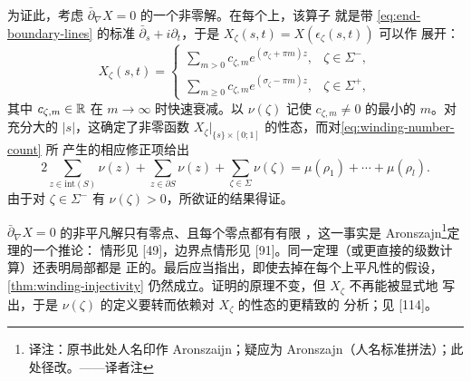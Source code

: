 为证此，考虑 $\bar\partial_\nabla X=0$ 的一个非零解。在每个\trStriplikeEnd{}上，该算子
就是带\trBoundaryCondition{} \eqref{eq:end-boundary-lines} 的标准
$\bar\partial_s+i\partial_t$，于是 $X_\zeta(s,t)=X(\epsilon_\zeta(s,t))$ 可以作%
\trFourier{}展开：
\begin{equation*}
X_\zeta(s,t)=
\begin{cases}
\sum_{m>0}c_{\zeta,m}e^{(\sigma_\zeta+\pi m)z}, & \zeta\in\Sigma^-,\\
\sum_{m\ge 0}c_{\zeta,m}e^{(\sigma_\zeta-\pi m)z}, & \zeta\in\Sigma^+,
\end{cases}
\end{equation*}
其中\trCoefficients{} $c_{\zeta,m}\in\mathbb{R}$ 在 $m\to\infty$ 时快速衰减。以 $\nu(\zeta)$ 记使
$c_{\zeta,m}\neq 0$ 的最小的 $m$。对充分大的 $|s|$，这确定了非零函数
$X_\zeta|_{\{s\}\times[0;1]}$ 的\trTopology{}性态，而对\eqref{eq:winding-number-count} 所
产生的相应修正项给出
\begin{equation*}
2\sum_{z\in\mathrm{int}(S)}\nu(z)+\sum_{z\in\partial S}\nu(z)+\sum_{\zeta\in\Sigma}\nu(\zeta)
=\mu(\rho_1)+\cdots+\mu(\rho_l).
\end{equation*}
由于对 $\zeta\in\Sigma^-$ 有 $\nu(\zeta)>0$，所欲证的结果得证。
\begin{remark}\label{thm:zeros-finite-multiplicity}
$\bar\partial_\nabla X=0$ 的非平凡解只有\trIsolated{}零点、且每个零点都有有限%
\trMultiplicity，这一事实是 Aronszajn\footnote{译注：原书此处人名印作 Aronszaijn；疑应为 Aronszajn（人名标准拼法）；此处径改。——译者注}\trUniqueContinuation{}定理的一个推论：%
\trInteriorPoint{}情形见 [49]，边界点情形见 [91]。同一定理（或更直接的\trTaylor{}级数计算）还表明局部\trMultiplicity{}都是
正的。最后应当指出，即使去掉在每个\trStriplikeEnd{}上平凡性的假设，
\cref{thm:winding-injectivity} 仍然成立。证明的原理不变，但 $X_\zeta$ 不再能被显式地
写出，于是 $\nu(\zeta)$ 的定义要转而依赖对 $X_\zeta$ 的\trAsymptotic{}性态的更精致的
分析；见 [114]。
\end{remark}
